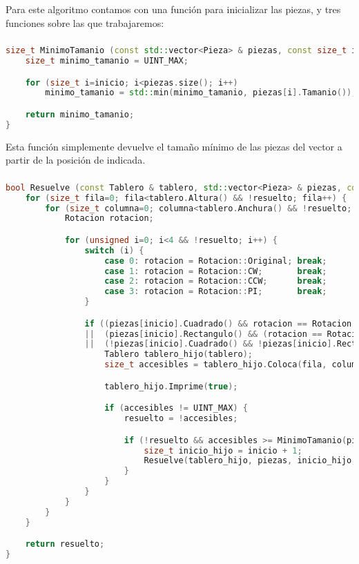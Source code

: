 Para este algoritmo contamos con una función para inicializar las piezas, y tres funciones sobre las que trabajaremos:

\subsubsection{}\label{grafos-implementacion-algoritmo-minimotamanio}

\begin{lstlisting}[language=C++]
size_t MinimoTamanio (const std::vector<Pieza> & piezas, const size_t inicio) {
	size_t minimo_tamanio = UINT_MAX;

	for (size_t i=inicio; i<piezas.size(); i++)
		minimo_tamanio = std::min(minimo_tamanio, piezas[i].Tamanio());

	return minimo_tamanio;
}
\end{lstlisting}

Esta función simplemente devuelve el tamaño mínimo de las piezas del vector  a partir de la posición de  indicada.

\pagebreak

\subsubsection{}\label{grafos-implementacion-algoritmo-resuelve}

\begin{lstlisting}[language=C++]
bool Resuelve (const Tablero & tablero, std::vector<Pieza> & piezas, const size_t & inicio, bool & resuelto) {
	for (size_t fila=0; fila<tablero.Altura() && !resuelto; fila++) {
		for (size_t columna=0; columna<tablero.Anchura() && !resuelto; columna++) {
			Rotacion rotacion;

			for (unsigned i=0; i<4 && !resuelto; i++) {
				switch (i) {
					case 0: rotacion = Rotacion::Original; break;
					case 1: rotacion = Rotacion::CW;       break;
					case 2: rotacion = Rotacion::CCW;      break;
					case 3: rotacion = Rotacion::PI;       break;
				}

				if ((piezas[inicio].Cuadrado() && rotacion == Rotacion::Original)
				||  (piezas[inicio].Rectangulo() && (rotacion == Rotacion::Original || rotacion == Rotacion::CW))
				||  (!piezas[inicio].Cuadrado() && !piezas[inicio].Rectangulo())) {
					Tablero tablero_hijo(tablero);
					size_t accesibles = tablero_hijo.Coloca(fila, columna, piezas[inicio], rotacion);

					tablero_hijo.Imprime(true);

					if (accesibles != UINT_MAX) {
						resuelto = !accesibles;

						if (!resuelto && accesibles >= MinimoTamanio(piezas, inicio+1)) {
							size_t inicio_hijo = inicio + 1;
							Resuelve(tablero_hijo, piezas, inicio_hijo, resuelto);
						}
					}
				}
			}
		}
	}

	return resuelto;
}
\end{lstlisting}

